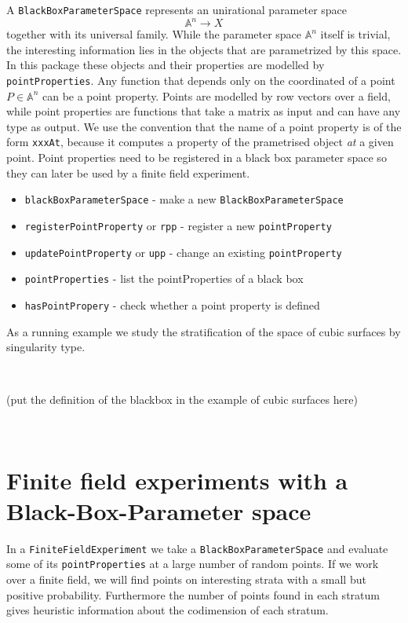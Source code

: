 \documentclass[12pt,a4paper]{amsart}
\theoremstyle{plain}
\theoremstyle{definition}
\renewcommand{\AA}{\mathbb A}
\begin{document}
A {\tt BlackBoxParameterSpace} represents an unirational parameter space
\[
	\AA^n \to X
\]
together with its universal family. While the parameter space $\AA^n$ itself is trivial, the interesting information lies in the objects that are parametrized by this space. In this package these objects and their properties are modelled by {\tt pointProperties}. Any function that depends only on the coordinated of a point $P \in \AA^n$ can be a point property. Points are modelled by row vectors over a field, while 
point properties are functions that take a matrix as input and can have any type as output. We use the convention that the name of a point property is of the form {\tt xxxAt}, because it computes a property of the prametrised object {\sl at} a given point. Point properties need to be registered in a black box parameter space so they can later be used by a finite field experiment. 

\begin{itemize}
\item {\tt blackBoxParameterSpace} - make a new {\tt BlackBoxParameterSpace}
\item {\tt registerPointProperty} or {\tt rpp} - register a new {\tt pointProperty}
\item {\tt updatePointProperty} or {\tt upp} - change an existing {\tt pointProperty}
\item {\tt pointProperties} - list the pointProperties of a black box
\item {\tt hasPointPropery} - check whether a point property is defined
\end{itemize}

As a running example we study the stratification of the space of cubic surfaces by singularity type. 

\

{\color{red} (put the definition of the blackbox in the example of cubic surfaces here)}

\

\section{Finite field experiments with a Black-Box-Parameter space}

In a {\tt FiniteFieldExperiment} we take a {\tt BlackBoxParameterSpace} and evaluate some of its {\tt pointProperties} at a large number of random points. If we work over a finite field, we will find points on interesting strata with a small but positive probability. Furthermore the number of points found in each stratum gives heuristic information about the codimension of each stratum.
\end{document}

